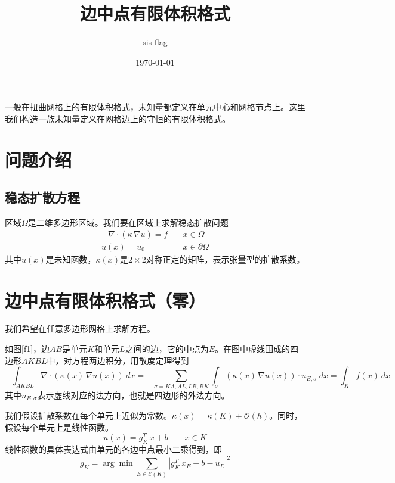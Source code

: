 \documentclass[12pt,a4paper]{article}
\title{边中点有限体积格式}
\author{sis-flag}
\date{\today}
\theoremstyle{plain}
\begin{document}
\maketitle

一般在扭曲网格上的有限体积格式，未知量都定义在单元中心和网格节点上。这里我们构造一族未知量定义在网格边上的守恒的有限体积格式。

\section*{问题介绍}

\subsection*{稳态扩散方程}

区域$\Omega$是二维多边形区域。我们要在区域上求解稳态扩散问题
\begin{equation*}
\begin{split}
- \nabla \cdot (\kappa \, \nabla u) = f & \quad x \in \Omega \\
u(x) = u_0 & \quad x \in \partial \Omega
\end{split}
\end{equation*}
其中$u(x)$是未知函数，$\kappa(x)$是$2 \times 2$对称正定的矩阵，表示张量型的扩散系数。


\section*{边中点有限体积格式（零）}

我们希望在任意多边形网格上求解方程。

如图\ref{f1}，边$AB$是单元$K$和单元$L$之间的边，它的中点为$E$。在图中虚线围成的四边形$AKBL$中，对方程两边积分，用散度定理得到
\begin{equation*}
- \int_{AKBL} \nabla \cdot (\kappa(x) \, \nabla u(x)) \ dx = - \sum_{\sigma = KA, AL, LB, BK} \int_{\sigma} (\kappa(x) \, \nabla u(x)) \cdot n_{E, \sigma} \ dx = \int_{K} f(x) \ dx
\end{equation*}
其中$n_{E, \sigma}$表示虚线对应的法方向，也就是四边形的外法方向。

我们假设扩散系数在每个单元上近似为常数。$\kappa(x) = \kappa(K) + \mathcal{O}(h)$。同时，假设每个单元上是线性函数。
\begin{equation*}
u(x) = g_K^T \, x + b \qquad x \in K
\end{equation*}
线性函数的具体表达式由单元的各边中点最小二乘得到，即
\begin{equation*}
g_K = \arg \min \sum_{E \in \mathcal{E}(K)} |g_K^T \, x_E + b - u_E|^2
\end{equation*}
\end{document}
